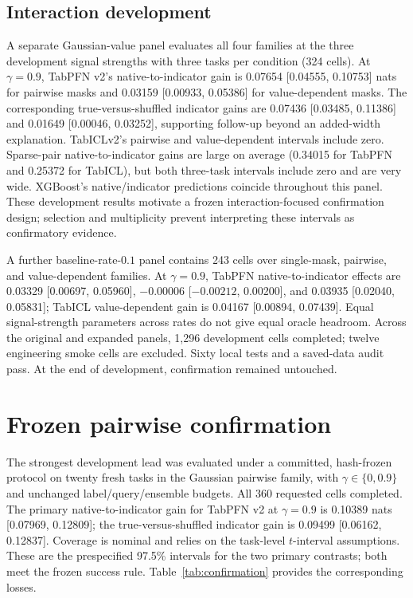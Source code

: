 \documentclass[10pt]{article}
\begin{document}
\subsection{Interaction development}
A separate Gaussian-value panel evaluates all four families at the three development signal strengths with three tasks per condition (324 cells). At $\gamma=0.9$, TabPFN v2's native-to-indicator gain is 0.07654 [0.04555, 0.10753] nats for pairwise masks and 0.03159 [0.00933, 0.05386] for value-dependent masks. The corresponding true-versus-shuffled indicator gains are 0.07436 [0.03485, 0.11386] and 0.01649 [0.00046, 0.03252], supporting follow-up beyond an added-width explanation. TabICLv2's pairwise and value-dependent intervals include zero. Sparse-pair native-to-indicator gains are large on average (0.34015 for TabPFN and 0.25372 for TabICL), but both three-task intervals include zero and are very wide. XGBoost's native/indicator predictions coincide throughout this panel. These development results motivate a frozen interaction-focused confirmation design; selection and multiplicity prevent interpreting these intervals as confirmatory evidence.

A further baseline-rate-$0.1$ panel contains 243 cells over single-mask, pairwise, and value-dependent families. At $\gamma=0.9$, TabPFN native-to-indicator effects are 0.03329 [0.00697, 0.05960], $-0.00006$ [$-0.00212$, 0.00200], and 0.03935 [0.02040, 0.05831]; TabICL value-dependent gain is 0.04167 [0.00894, 0.07439]. Equal signal-strength parameters across rates do not give equal oracle headroom. Across the original and expanded panels, 1,296 development cells completed; twelve engineering smoke cells are excluded. Sixty local tests and a saved-data audit pass. At the end of development, confirmation remained untouched.

\section{Frozen pairwise confirmation}
The strongest development lead was evaluated under a committed, hash-frozen protocol on twenty fresh tasks in the Gaussian pairwise family, with $\gamma\in\{0,0.9\}$ and unchanged label/query/ensemble budgets. All 360 requested cells completed. The primary native-to-indicator gain for TabPFN v2 at $\gamma=0.9$ is 0.10389 nats [0.07969, 0.12809]; the true-versus-shuffled indicator gain is 0.09499 [0.06162, 0.12837]. Coverage is nominal and relies on the task-level $t$-interval assumptions. These are the prespecified 97.5\% intervals for the two primary contrasts; both meet the frozen success rule. Table~\ref{tab:confirmation} provides the corresponding losses.
\end{document}
